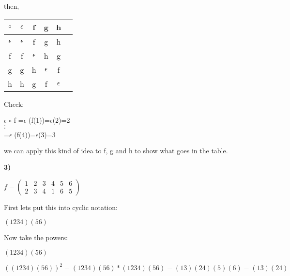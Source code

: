 \documentclass{article}
\begin{document}
\medskip


then,



\begin{table} [ht]
 \begin{tabular}{ | c | c | c | c | c |c|} 
 	\hline  
 	$\circ$  & $\epsilon$ & f & g & h \\
	\hline 
	$\epsilon$ &  $\epsilon$ & f  &  g &  h\\
	\hline
	f   & f  &  $\epsilon$ & h & g \\
	\hline
	g   &   g &  h & $\epsilon$ & f \\
	\hline
	  h &  h  & g  & f & $\epsilon$ 
	\end{tabular}
\end{table} 

\medskip
Check:


\begin{center}
$\epsilon$  $\circ$ f =$\epsilon$ (f(1))=$\epsilon $(2)=2 \\		
			$\cdot$ \\
			$\cdot$ \\
				\hspace{.3in} =$\epsilon$ (f(4))=$\epsilon$(3)=3 \\
\end{center}

we can apply this kind of idea to f, g and h to show what goes in the table.






\medskip


\bigskip
\bigskip


\textbf{3)}

$f=(\begin{smallmatrix}
1& 2 & 3 & 4 & 5 & 6 \\
2 & 3 & 4 & 1 & 6 & 5
\end{smallmatrix}) $

\medskip

First lets put this into cyclic notation:

\begin{center} 
$(1234)(56)$
\end{center}

\medskip

Now take the powers:

\bigskip

$(1234)(56)$

\bigskip


$((1234)(56))^2=(1234)(56) *(1234)(56)=(13)(24)(5)(6)=(13)(24)$
\end{document}
